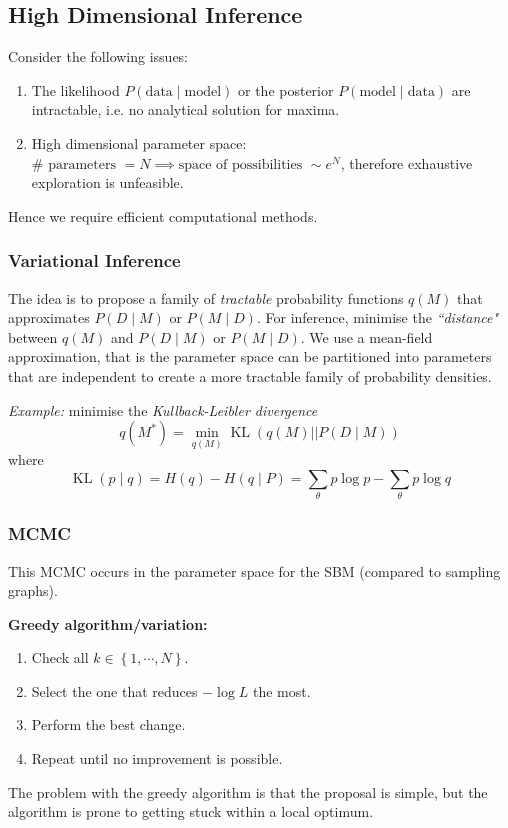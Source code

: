 \documentclass[12pt]{article}
\theoremstyle{definition}
\newcommand{\given}{\;|\;}
\newcommand{\br}[1]{\left({#1}\right)}
\newcommand{\cur}[1]{\left\{{#1}\right\}}
\begin{document}
\subsection{High Dimensional Inference}

Consider the following issues: 
\begin{enumerate}
    \item The likelihood $P(\mathrm{data}\mid \mathrm{model})$ or the posterior $P(\mathrm{model}\mid \mathrm{data})$ are intractable, i.e. no analytical solution for maxima. 
    \item High dimensional parameter space: $\#\text{ parameters }= N \implies \text{space of possibilities } \sim e^N$, therefore exhaustive exploration is unfeasible. 
\end{enumerate}
Hence we require efficient computational methods. 

\subsubsection{Variational Inference}

The idea is to propose a family of \textit{tractable} probability functions $q(M)$ that approximates $P\br{D\given M}$ or $P\br{M\given D}$. For inference, minimise the \textit{``distance"} between $q(M)$ and $P\br{D\given M}$ or $P\br{M\given D}$. We use a mean-field approximation, that is the parameter space can be partitioned into parameters that are independent to create a more tractable family of probability densities.

\textit{Example:} minimise the \textit{Kullback-Leibler divergence}
\[
q(M^*) = \min_{q(M)}\operatorname{KL}\br{q(M)||P(D\given M)}
\]
where 
\[
\operatorname{KL}(p\mid q) = H(q)-H(q\given P) = \sum_\theta p\log p - \sum_\theta p\log q
\]

\subsubsection{MCMC}

This MCMC occurs in the parameter space for the SBM (compared to sampling graphs).

\textbf{Greedy algorithm/variation:}
\begin{enumerate}
    \item Check all $k\in\cur{1,\cdots, N}$. 
    \item Select the one that reduces $-\log L$ the most. 
    \item Perform the best change. 
    \item Repeat until no improvement is possible. 
\end{enumerate}
The problem with the greedy algorithm is that the proposal is simple, but the algorithm is prone to getting stuck within a local optimum.
\end{document}
